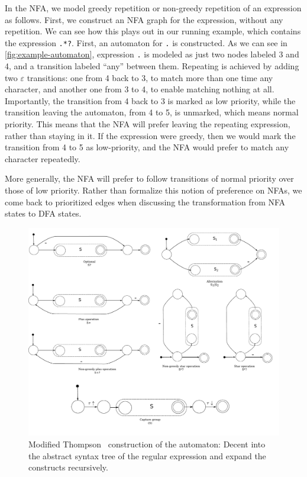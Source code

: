 \documentclass[english]{sigplanconf}
\theoremstyle{definition}
\begin{document}
In the NFA, we model greedy repetition or non-greedy repetition of
an expression as follows.  First, we construct an NFA graph for the
expression, without any repetition.  We can see how this plays out
in our running example, which contains the expression \texttt{.*?}.
First, an automaton for \texttt{.} is constructed.  As we can see
in \autoref{fig:example-automaton}, expression \texttt{.} is modeled as
just two nodes labeled 3 and 4, and a transition labeled ``any''
between them.  Repeating is achieved by adding two $\varepsilon$
transitions: one from 4 back to 3, to match more than one time any
character, and another one from 3 to 4, to enable matching nothing
at all.  Importantly, the transition from 4 back to 3 is marked as
low priority, while the transition leaving the automaton, from 4
to 5, is unmarked, which means normal priority.  This means that
the NFA will prefer leaving the repeating expression, rather than
staying in it.  If the expression were greedy, then we would mark
the transition from 4 to 5 as low-priority, and the NFA would prefer
to match any character repeatedly.

More generally, the NFA will prefer to follow transitions of normal
priority over those of low priority. Rather than formalize this
notion of preference on NFAs, we come back to prioritized edges when
discussing the transformation from NFA states to DFA states.


\begin{figure}[tb]
\includegraphics[width=\linewidth]{graphs/thompson}
\caption{Modified Thompson~\cite{Thom68a} construction of the automaton: Decent into the abstract syntax tree of the regular expression and expand the constructs recursively.}
\label{fig:thompson-construction}
\end{figure}
\end{document}
